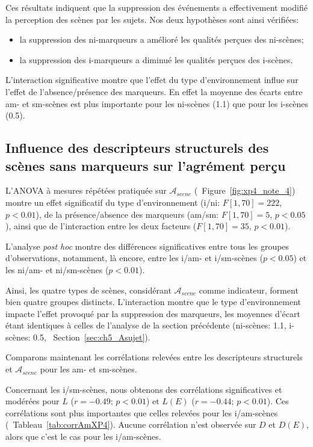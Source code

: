 Ces résultats indiquent que la suppression des événements a effectivement modifié la perception des scènes par les sujets. Nos deux hypothèses sont ainsi vérifiées:

\begin{itemize}
\item la suppression des ni-marqueurs a amélioré les qualités perçues des ni-scènes;
\item la suppression des i-marqueurs a diminué les qualités perçues des i-scènes.
\end{itemize}

L'interaction significative montre que l'effet du type d'environnement influe sur l'effet de l'absence/présence des marqueurs. En effet la moyenne des écarts entre am- et sm-scènes est plus importante pour les ni-scènes (1.1) que pour les i-scènes (0.5). 


\subsection{Influence des descripteurs structurels des scènes sans marqueurs sur l'agrément perçu}

L'ANOVA à mesures répétées pratiquée sur $\mathcal{A}_{scene}$ (\cf~Figure~\ref{fig:xp4_note_4}) montre un effet significatif du type d'environnement (i/ni: $F[1,70]=222$, $p<0.01$), de la présence/absence des marqueurs (am/sm: $F[1,70]=5$, $p<0.05$), ainsi que de l'interaction entre les deux facteurs ($F[1,70]=35$, $p<0.01$).

L'analyse \emph{post hoc} montre des différences significatives entre tous les groupes d'observations, notamment, là encore, entre les i/am- et i/sm-scènes ($p<0.05$) et les ni/am- et ni/sm-scènes ($p<0.01$).

Ainsi, les quatre types de scènes, considérant $\mathcal{A}_{scene}$ comme indicateur, forment bien quatre groupes distincts. L'interaction montre que le type d'environnement impacte l'effet provoqué par la suppression des marqueurs, les moyennes d'écart étant identiques à celles de l'analyse de la section précédente (ni-scènes: 1.1,  i-scènes: 0.5, \cf~Section~\ref{sec:ch5_Asujet}). 

Comparons maintenant les corrélations relevées entre les descripteurs structurels et $\mathcal{A}_{scene}$ pour les am- et sm-scènes.

Concernant les i/sm-scènes, nous obtenons des corrélations significatives et modérées pour $L$ ($r=-0.49$; $p<0.01$) et  $L(E)$ ($r=-0.44$; $p<0.01$). Ces corrélations sont plus importantes que celles relevées pour les i/am-scènes (\cf~Tableau~\ref{tab:corrAmXP4}). Aucune corrélation n'est observée sur $D$ et $D(E)$, alors que c'est le cas pour les i/am-scènes.

